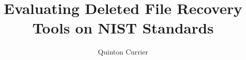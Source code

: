\documentclass[11pt]{article}
\begin{document}
\date{}

\title {\vspace{-1in} \Large{Evaluating Deleted File Recovery Tools on NIST Standards} \vspace{-.25in}}
\author{\large{Quinton Currier}}
\maketitle
\vspace{-.3in}

\thispagestyle{empty} 


%

%



\end{document}
